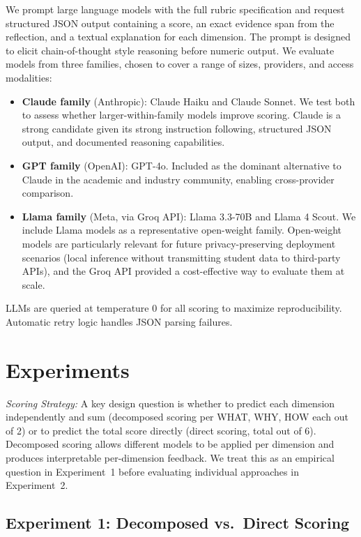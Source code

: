 \documentclass[11pt]{article}
\begin{document}
We prompt large language models with the full rubric specification and request structured JSON output containing a score, an exact evidence span from the reflection, and a textual explanation for each dimension. The prompt is designed to elicit chain-of-thought style reasoning before numeric output. We evaluate models from three families, chosen to cover a range of sizes, providers, and access modalities:

\begin{itemize}
    \item \textbf{Claude family} (Anthropic): Claude Haiku and Claude Sonnet. We test both to assess whether larger-within-family models improve scoring. Claude is a strong candidate given its strong instruction following, structured JSON output, and documented reasoning capabilities.
    \item \textbf{GPT family} (OpenAI): GPT-4o. Included as the dominant alternative to Claude in the academic and industry community, enabling cross-provider comparison.
    \item \textbf{Llama family} (Meta, via Groq API): Llama 3.3-70B and Llama 4 Scout. We include Llama models as a representative open-weight family. Open-weight models are particularly relevant for future privacy-preserving deployment scenarios (local inference without transmitting student data to third-party APIs), and the Groq API provided a cost-effective way to evaluate them at scale.
\end{itemize}

LLMs are queried at temperature 0 for all scoring to maximize reproducibility. Automatic retry logic handles JSON parsing failures.

\section{Experiments}
\noindent\textit{Scoring Strategy:} A key design question is whether to predict each dimension independently and sum (decomposed scoring per WHAT, WHY, HOW each out of 2) or to predict the total score directly (direct scoring, total out of 6). Decomposed scoring allows different models to be applied per dimension and produces interpretable per-dimension feedback. We treat this as an empirical question in Experiment~1 before evaluating individual approaches in Experiment~2.

\subsection{Experiment 1: Decomposed vs.\ Direct Scoring}
\end{document}
